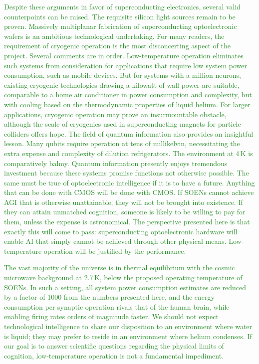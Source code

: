 \documentclass[twocolumn]{article}
\begin{document}
\textcolor{ForestGreen}{Despite these arguments in favor of superconducting electronics, several valid counterpoints can be raised. The requisite silicon light sources remain to be proven. Massively multiplanar fabrication of superconducting optoelectronic wafers is an ambitious technological undertaking. For many readers, the requirement of cryogenic operation is the most disconcerting aspect of the project. Several comments are in order. Low-temperature operation eliminates such systems from consideration for applications that require low system power consumption, such as mobile devices. But for systems with a million neurons, existing cryogenic technologies drawing a kilowatt of wall power are suitable, comparable to a home air conditioner in power consumption and complexity, but with cooling based on the thermodynamic properties of liquid helium. For larger applications, cryogenic operation may prove an insurmountable obstacle, although the scale of cryogenics used in superconducting magnets for particle colliders offers hope. The field of quantum information also provides an insightful lesson. Many qubits require operation at tens of millikelvin, necessitating the extra expense and complexity of dilution refrigerators. The environment at 4\,K is comparatively balmy. Quantum information presently enjoys tremendous investment because these systems promise functions not otherwise possible. The same must be true of optoelectronic intelligence if it is to have a future. Anything that can be done with CMOS will be done with CMOS. If SOENs cannot achieve AGI that is otherwise unattainable, they will not be brought into existence. If they can attain unmatched cognition, someone is likely to be willing to pay for them, unless the expense is astronomical. The perspective presented here is that exactly this will come to pass: superconducting optoelectronic hardware will enable AI that simply cannot be achieved through other physical means. Low-temperature operation will be justified by the performance.}

\textcolor{ForestGreen}{The vast majority of the universe is in thermal equilibrium with the cosmic microwave background at 2.7\,K, below the proposed operating temperature of SOENs. In such a setting, all system power consumption estimates are reduced by a factor of 1000 from the numbers presented here, and the energy consumption per synaptic operation rivals that of the human brain, while enabling firing rates orders of magnitude faster. We should not expect technological intelligence to share our disposition to an environment where water is liquid; they may prefer to reside in an environment where helium condenses. If our goal is to answer scientific questions regarding the physical limits of cognition, low-temperature operation is not a fundamental impediment.}
\end{document}
